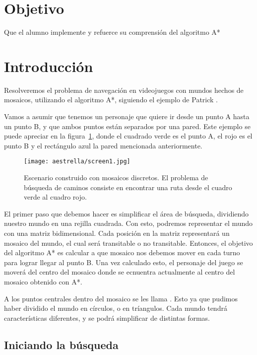 
\section{Objetivo}
Que el alumno implemente y refuerce su comprensión del algoritmo A* \par

\section{Introducci\'on}

Resolveremos el problema de navegación en videojuegos con mundos hechos de mosaicos, utilizando el algoritmo A*, siguiendo el ejemplo de Patrick \cite{Lester2003}.

Vamos a asumir que tenemos un personaje que quiere ir desde un punto A hasta un punto B, y que ambos puntos están separados por una pared. Este ejemplo se puede apreciar en la figura~\ref{fig:fig1P4}, donde el cuadrado verde es el punto A, el rojo es el punto B y el rectángulo azul la pared mencionada anteriormente.

\begin{figure}[h!]
  \centering
  \texttt{[image: aestrella/screen1.jpg]}
  \caption{Escenario construido con mosaicos discretos. El problema de búsqueda de caminos consiste en encontrar una ruta desde el cuadro verde al cuadro rojo.}
  \label{fig:fig1P4}
\end{figure}

El primer paso que debemos hacer es simplificar el área de búsqueda, dividiendo nuestro mundo en una rejilla cuadrada. Con esto, podremos representar el mundo con una matriz bidimensional. Cada posición en la matriz representará un mosaico del mundo, el cual será transitable o no transitable. Entonces, el objetivo del algoritmo A* es calcular a que mosaico nos debemos mover en cada turno para lograr llegar al punto B. Una vez calculado esto, el personaje del juego se moverá del centro del mosaico donde se ecnuentra actualmente al centro del mosaico obtenido con A*.

A los puntos centrales dentro del mosaico se les llama . Esto ya que pudimos haber dividido el mundo en círculos, o en tríangulos. Cada mundo tendrá características diferentes, y se podrá simplificar de distintas formas.

\subsection{Iniciando la b\'usqueda}

